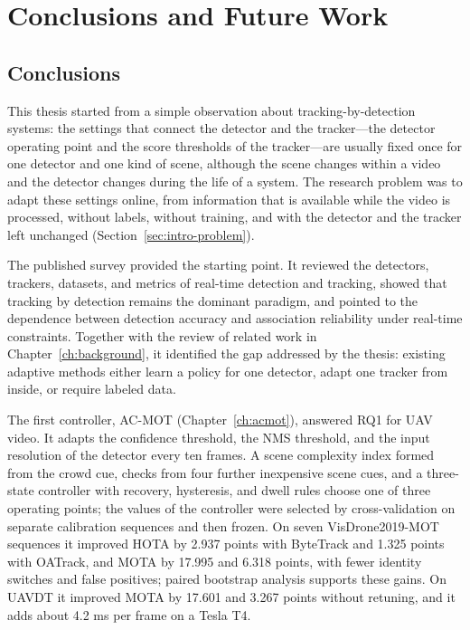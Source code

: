 \chapter{Conclusions and Future Work}\label{ch:conclusions}

\section{Conclusions}\label{sec:conc-conclusion}
This thesis started from a simple observation about tracking-by-detection systems: the settings that connect the detector and the tracker---the detector operating point and the score thresholds of the tracker---are usually fixed once for one detector and one kind of scene, although the scene changes within a video and the detector changes during the life of a system. The research problem was to adapt these settings online, from information that is available while the video is processed, without labels, without training, and with the detector and the tracker left unchanged (Section~\ref{sec:intro-problem}).

The published survey \cite{ismail2026realtime} provided the starting point. It reviewed the detectors, trackers, datasets, and metrics of real-time detection and tracking, showed that tracking by detection remains the dominant paradigm, and pointed to the dependence between detection accuracy and association reliability under real-time constraints. Together with the review of related work in Chapter~\ref{ch:background}, it identified the gap addressed by the thesis: existing adaptive methods either learn a policy for one detector, adapt one tracker from inside, or require labeled data.

The first controller, AC-MOT (Chapter~\ref{ch:acmot}), answered RQ1 for UAV video. It adapts the confidence threshold, the NMS threshold, and the input resolution of the detector every ten frames. A scene complexity index formed from the crowd cue, checks from four further inexpensive scene cues, and a three-state controller with recovery, hysteresis, and dwell rules choose one of three operating points; the values of the controller were selected by cross-validation on separate calibration sequences and then frozen. On seven VisDrone2019-MOT sequences it improved HOTA by 2.937 points with ByteTrack and 1.325 points with OATrack, and MOTA by 17.995 and 6.318 points, with fewer identity switches and false positives; paired bootstrap analysis supports these gains. On UAVDT it improved MOTA by 17.601 and 3.267 points without retuning, and it adds about 4.2 ms per frame on a Tesla T4.

